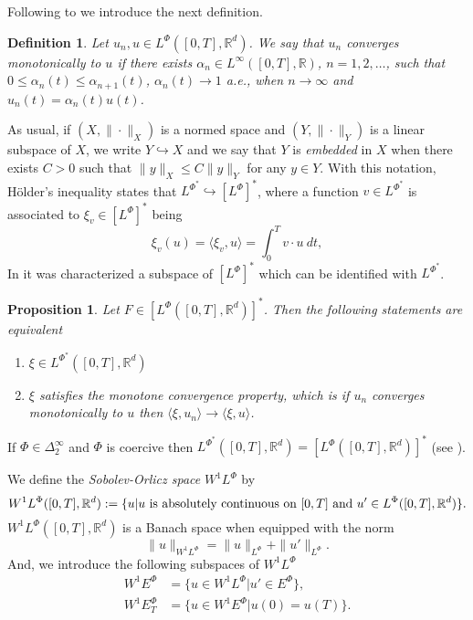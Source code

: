 \documentclass[twoside]{article}
\newtheorem{defi}[thm]{Definition}
\newtheorem{prop}[thm]{Proposition}
\theoremstyle{remark}
\newcommand{\orlnor}{\|_{L^{\Phi}}}
\newcommand{\lphi}{L^{\Phi}}
\newcommand{\lpsi}{L^{\Phi^*}}
\newcommand{\ephi}{E^{\Phi}}
\newcommand{\wphi}{W^{1}\lphi}
\newcommand{\wphie}{W^{1}\ephi}
\newcommand{\rr}{\mathbb{R}}
\renewcommand{\leq}{\leqslant}
\begin{document}
Following to \cite{Desch2001} we introduce the next definition.

\begin{defi} Let $u_n,u\in\lphi([0,T],\rr^d)$. We say that $u_n$ converges monotonically to $u$ if there exists $\alpha_n\in L^{\infty}([0,T],\rr)$, $n=1,2,\ldots$, such that $0\leq \alpha_n(t)\leq \alpha_{n+1}(t)$, $\alpha_n(t)\to 1$ a.e., when $n\to\infty$ and $u_n(t)=\alpha_n(t)u(t)$.

\end{defi}

 
As usual, if $(X,\|\cdot\|_X)$ is a normed space and $(Y,\|\cdot \|_Y)$ is a linear subspace of $X$,  we write $Y\hookrightarrow X$ and we say that $Y$ is \emph{embedded} in $X$  when there exists $C>0$ such that
$\|y\|_X\leq C\|y\|_Y$ for any $y\in Y$.  With this notation, H\"older's inequality states that  $\lpsi\hookrightarrow  \left[\lphi\right]^*$, where a function $v\in\lpsi$ is associated  to $\xi_v\in \left[\lphi\right]^*$ being
\begin{equation}\label{pairing}
  \xi_v(u)=\langle \xi_v,u\rangle=\int_0^Tv\cdot u\ dt,
\end{equation}
 In  \cite[Thm 2.9]{Desch2001}  it was characterized a subspace of   $\left[\lphi\right]^*$ which can be identified with $\lpsi$.

 \begin{prop} Let $F\in\left[\lphi([0,T],\rr^d)\right]^*$. Then the following statements are equivalent
 \begin{enumerate}
  \item $\xi\in \lpsi([0,T],\rr^d)$
  \item $\xi$ satisfies the \emph{monotone convergence property}, which is if $u_n$ converges monotonically to $u$ then $\langle \xi,u_n\rangle\to \langle \xi,u\rangle$.
 \end{enumerate}
 \end{prop}

 If $\Phi \in \Delta_2^{\infty}$ and $\Phi$ is coercive then $\lpsi([0,T],\rr^d)= \left[\lphi([0,T],\rr^d)\right]^*$  (see \cite[Thm. 2.9 , Thm. 2.10]{Desch2001}).





We define the \emph{Sobolev-Orlicz space} $\wphi$ by
\[\wphi([0,T],\rr^d):=\{u| u \hbox{ is absolutely continuous on $[0,T]$ and } u'\in \lphi([0,T],\rr^d)\}.\]
$\wphi([0,T],\rr^d)$ is a Banach space when equipped with the norm
\begin{equation}\label{def-norma-orlicz-sob}
\|  u  \|_{\wphi}= \|  u  \|_{\lphi} + \|u'\orlnor.
\end{equation}
And, we introduce the following subspaces of $\wphi$
\begin{equation}\label{def-esp-orlicz-sob-per}
\begin{split}
\wphie&=\{u\in\wphi|u'\in\ephi\},\\
\wphie_T&=\{u\in\wphie|u(0)=u(T)\}.
\end{split}
\end{equation}
\end{document}
